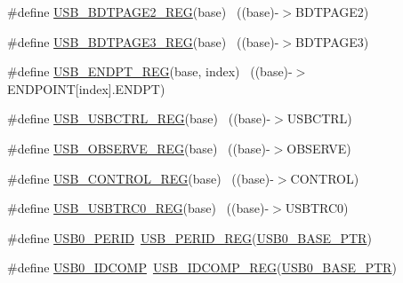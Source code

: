 \begin{DoxyCompactItemize}
\item 
\#define \hyperlink{group___u_s_b___register___accessor___macros_gaa6efc82627e2983372a9cafa08d3e646}{U\+S\+B\+\_\+\+B\+D\+T\+P\+A\+G\+E2\+\_\+\+R\+EG}(base)                                  ~((base)-\/$>$B\+D\+T\+P\+A\+G\+E2)
\item 
\#define \hyperlink{group___u_s_b___register___accessor___macros_ga2b3f2b53d240a5769557b3bf86c2e3ea}{U\+S\+B\+\_\+\+B\+D\+T\+P\+A\+G\+E3\+\_\+\+R\+EG}(base)                                  ~((base)-\/$>$B\+D\+T\+P\+A\+G\+E3)
\item 
\#define \hyperlink{group___u_s_b___register___accessor___macros_ga2d64e95d192db6bf8f035cc6a7cf48d6}{U\+S\+B\+\_\+\+E\+N\+D\+P\+T\+\_\+\+R\+EG}(base,  index)                            ~((base)-\/$>$E\+N\+D\+P\+O\+I\+NT\mbox{[}index\mbox{]}.E\+N\+D\+PT)
\item 
\#define \hyperlink{group___u_s_b___register___accessor___macros_ga73ac0c0c60bf6fd8e2ed9dee3f2aa436}{U\+S\+B\+\_\+\+U\+S\+B\+C\+T\+R\+L\+\_\+\+R\+EG}(base)                                    ~((base)-\/$>$U\+S\+B\+C\+T\+RL)
\item 
\#define \hyperlink{group___u_s_b___register___accessor___macros_ga2ee1aa6fd76b49402bf4a1799687e944}{U\+S\+B\+\_\+\+O\+B\+S\+E\+R\+V\+E\+\_\+\+R\+EG}(base)                                    ~((base)-\/$>$O\+B\+S\+E\+R\+VE)
\item 
\#define \hyperlink{group___u_s_b___register___accessor___macros_ga9c4c4c5d0d19933e8c0ab5ac5dfe48a5}{U\+S\+B\+\_\+\+C\+O\+N\+T\+R\+O\+L\+\_\+\+R\+EG}(base)                                    ~((base)-\/$>$C\+O\+N\+T\+R\+OL)
\item 
\#define \hyperlink{group___u_s_b___register___accessor___macros_gaf054f3a4251da894e8431bb28eceaa6e}{U\+S\+B\+\_\+\+U\+S\+B\+T\+R\+C0\+\_\+\+R\+EG}(base)                                    ~((base)-\/$>$U\+S\+B\+T\+R\+C0)
\item 
\#define \hyperlink{group___u_s_b___register___accessor___macros_gabee4af6581d4520bd5d8d823d8668889}{U\+S\+B0\+\_\+\+P\+E\+R\+ID}~\hyperlink{group___u_s_b___register___accessor___macros_gaf7ac61d8729d7357b45ebb18042334e5}{U\+S\+B\+\_\+\+P\+E\+R\+I\+D\+\_\+\+R\+EG}(\hyperlink{group___u_s_b___peripheral_ga598ff5eb20a0551af232710b3f27640a}{U\+S\+B0\+\_\+\+B\+A\+S\+E\+\_\+\+P\+TR})
\item 
\#define \hyperlink{group___u_s_b___register___accessor___macros_gac5372cae1990fc1ac7c4e92cf5f02e62}{U\+S\+B0\+\_\+\+I\+D\+C\+O\+MP}~\hyperlink{group___u_s_b___register___accessor___macros_ga4ea3ccb3fd6a83a960e21b2a07fa78a4}{U\+S\+B\+\_\+\+I\+D\+C\+O\+M\+P\+\_\+\+R\+EG}(\hyperlink{group___u_s_b___peripheral_ga598ff5eb20a0551af232710b3f27640a}{U\+S\+B0\+\_\+\+B\+A\+S\+E\+\_\+\+P\+TR})

\end{DoxyCompactItemize}
